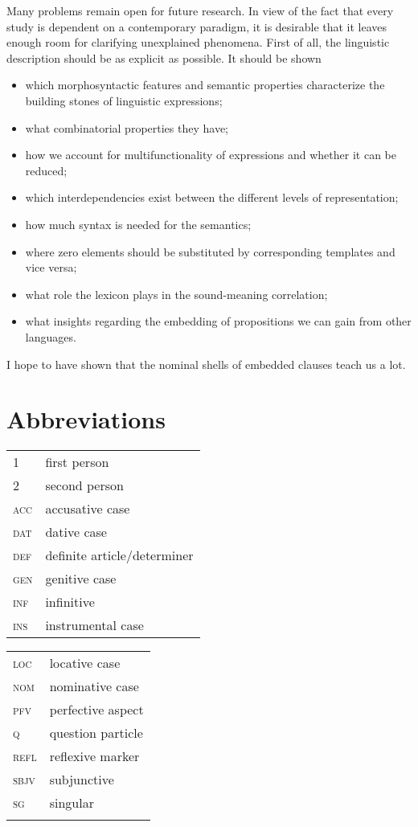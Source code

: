 \documentclass[output=paper]{langscibook}
\begin{document}
Many problems remain open for future research. In view of the fact that every study is dependent on a contemporary paradigm, it is desirable that it leaves enough room for clarifying unexplained phenomena. First of all, the linguistic description should be as explicit as possible. It should be shown

\begin{itemize}
    \item which morphosyntactic features and semantic properties characterize the building stones of linguistic expressions;
    \item what combinatorial properties they have;
    \item how we account for multifunctionality of expressions and whether it can be reduced;
    \item which interdependencies exist between the different levels of representation;
    \item how much syntax is needed for the semantics;
    \item where zero elements should be substituted by corresponding templates and vice versa;
    \item what role the lexicon plays in the sound-meaning correlation;
    \item what insights regarding the embedding of propositions we can gain from other languages.
\end{itemize}

I hope to have shown that the nominal shells of embedded clauses teach us a lot.


\section*{Abbreviations}
\begin{tabularx}{.5\textwidth}{@{}lQ}
\textsc{1} & first person\\
\textsc{2} & second person\\
\textsc{acc} & accusative case\\
\textsc{dat} & dative case\\
\textsc{def} & definite article/determiner\\
\textsc{gen} & genitive case\\
\textsc{inf} & infinitive\\
\textsc{ins} & instrumental case\\
\end{tabularx}%
\begin{tabularx}{.5\textwidth}{lQ@{}}
\textsc{loc} & locative case\\
\textsc{nom} & nominative case\\
\textsc{pfv} & perfective aspect\\
\textsc{q} & question particle\\
\textsc{refl} & reflexive marker\\
\textsc{sbjv} & subjunctive\\
\textsc{sg} & singular\\
& \\
\end{tabularx}
\end{document}
